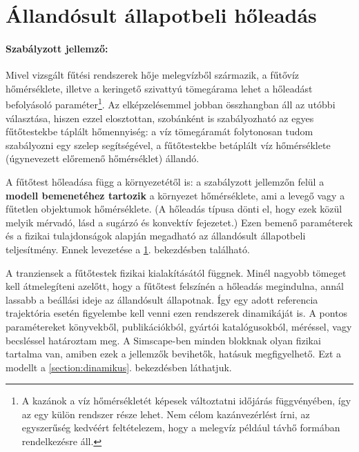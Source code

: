 


\section{Állandósult állapotbeli hőleadás}\label{section:allandosult}

\paragraph{Szabályzott jellemző: }Mivel vizsgált fűtési rendszerek hője melegvízből származik, a fűtővíz %
hőmérséklete, illetve a keringető szivattyú tömegárama lehet a hőleadást befolyásoló paraméter\footnote{A kazánok a víz hőmérsékletét képesek változtatni időjárás függvényében, így az egy külön rendszer része lehet. Nem célom kazánvezérlést írni, az egyszerűség kedvéért feltételezem, hogy a melegvíz például távhő formában rendelkezésre áll.}. Az elképzelésemmel jobban összhangban áll az utóbbi választása, hiszen ezzel elosztottan, szobánként is szabályozható az egyes fűtőtestekbe táplált hőmennyiség: a víz tömegáramát folytonosan tudom szabályozni egy szelep segítségével, a fűtőtestekbe betáplált víz hőmérséklete (úgynevezett előremenő hőmérséklet) állandó.


A fűtőtest hőleadása függ a környezetétől is: a szabályzott jellemzőn felül a \textbf{modell bemenetéhez tartozik} a környezet hőmérséklete, ami a levegő vagy a fűtetlen objektumok hőmérséklete. (A hőleadás típusa dönti el, hogy ezek közül melyik mérvadó, lásd a sugárzó és konvektív fejezetet.)
Ezen bemenő paraméterek és a fizikai tulajdonságok alapján megadható az állandósult állapotbeli teljesítmény. Ennek levezetése a \ref{section:allandosult}. bekezdésben található.

A tranziensek a fűtőtestek fizikai kialakításától függnek. Minél nagyobb tömeget kell átmelegíteni azelőtt, hogy a fűtőtest felszínén a hőleadás megindulna, annál lassabb a beállási ideje az állandósult állapotnak. Így egy adott referencia trajektória esetén figyelembe kell venni ezen rendszerek dinamikáját is. A pontos paramétereket könyvekből, publikációkból, gyártói katalógusokból, méréssel, vagy becsléssel határoztam meg. A Simscape-ben minden blokknak olyan fizikai tartalma van, amiben ezek a jellemzők bevihetők, hatásuk megfigyelhető. Ezt a modellt a \ref{section:dinamikus}. bekezdésben láthatjuk.

